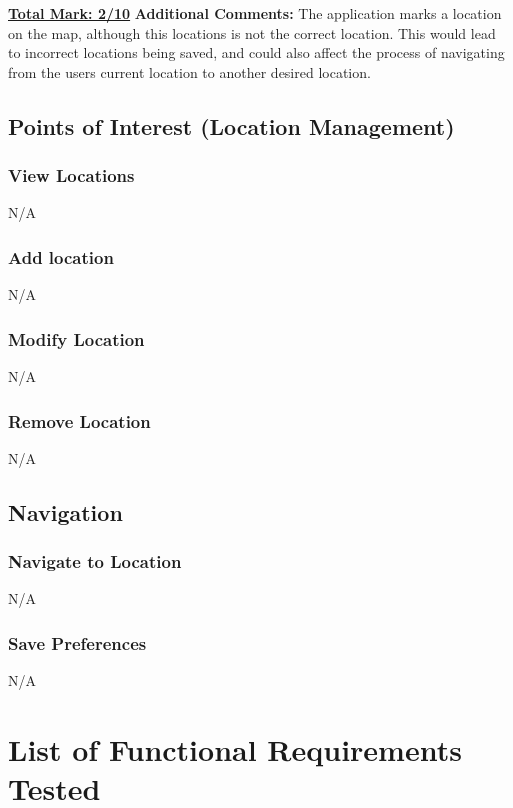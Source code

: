 \documentclass[english]{article}
\begin{document}
\textbf{\underline{Total Mark: 2/10}}\newline
\textbf{Additional Comments:} The application marks a location on the map, although this locations is not the correct location. This would lead to incorrect locations being saved, and could also affect the process of navigating from the users current location to another desired location.\newline


\subsection{Points of Interest (Location Management)}

\subsubsection{View Locations}
N/A
\subsubsection{Add location}
N/A
\subsubsection{Modify Location}
N/A
\subsubsection{Remove Location}
N/A

\subsection{Navigation}

\subsubsection{Navigate to Location}
N/A
\subsubsection{Save Preferences}
N/A

	\section{List of Functional Requirements Tested}
	
\end{document}
